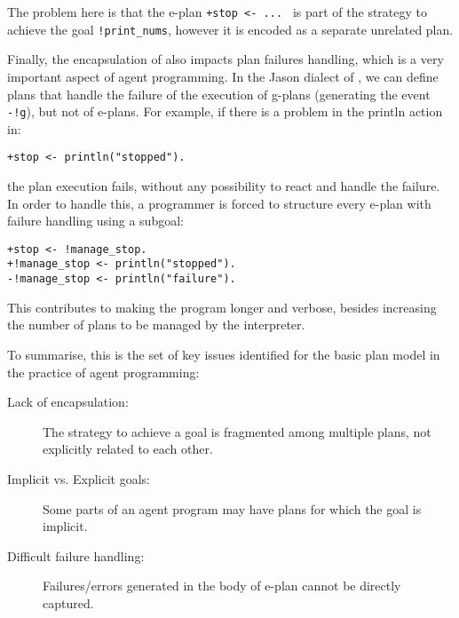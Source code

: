 \noindent The problem here is that the e-plan \texttt{+stop <- ... } is
part of the strategy to achieve the goal \texttt{!print\_nums}, however
it is encoded as a separate unrelated plan.


Finally, the encapsulation of  also impacts  plan failures handling, which is a very
important aspect of agent programming.
%
In the Jason dialect of {\asl}, we can define plans that handle the
failure of the execution of g-plans (generating the event
\texttt{-!g}), but not of e-plans.
%
For example, if there is a problem in the println action in:

\begin{small}
\begin{verbatim}
+stop <- println("stopped").
\end{verbatim}
\end{small}

\noindent the plan execution fails, without any possibility to react
and handle the failure.
%
In order to handle this, a programmer is forced to structure every
e-plan with failure handling using a subgoal:

\begin{small}
\begin{verbatim}
+stop <- !manage_stop.
+!manage_stop <- println("stopped").
-!manage_stop <- println("failure").
\end{verbatim}
\end{small}

\noindent This contributes to making the program longer and verbose,
besides increasing the number of plans to be managed by the
interpreter.


\bigskip

To summarise, this is the set of key issues identified for the basic
plan model in the practice of agent programming:
%
\begin{description}
%
\item[Lack of encapsulation:] The strategy to achieve a goal is
  fragmented among multiple plans, not explicitly related to each
  other.
%
\item[Implicit vs. Explicit goals:] Some parts of an agent program may
  have plans for which the goal is implicit.
%
\item[Difficult failure handling:] Failures/errors generated in the
  body of e-plan cannot be directly captured.
%
\end{description}



